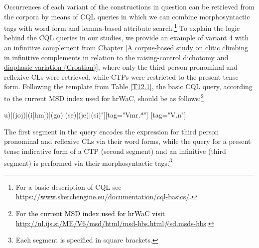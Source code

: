 \begin{table}
\caption{Permuted constructions with verbal complements.\label{T12.1}}
\end{table}

Occurrences of each variant of the constructions in question can be retrieved from the corpora by means of CQL queries in which we can combine morphosyntactic tags with word form and lemma-based attribute search.\footnote{For a basic description of CQL see \url{https://www.sketchengine.eu/documentation/cql-basics/}.} To explain the logic behind the CQL queries in our studies, we provide an example of variant 4 with an infinitive complement from Chapter \ref{A corpus-based study on clitic climbing in infinitive complements in relation to the raising-control dichotomy and diaphasic variation (Croatian)}, where only the third person pronominal and reflexive CLs were retrieved, while CTPs were restricted to the present tense form. Following the template from Table \ref{T12.1}, the basic CQL query, according to the current MSD index used for hrWaC, should be as follows:\footnote{\textcolor{black}{For the current MSD index used for hrWaC visit} \url{http://nl.ijs.si/ME/V6/msd/html/msd-hbs.html\#sd.msds-hbs}.}


\noindent\begin{verbatim*}
[(word="([mj]u)|(joj)|(i[hm])|(ga)|(se)|(je)|(si)"][tag="Vmr.*"]
[tag="V.n"]
\end{verbatim*}


\noindent The first segment in the query encodes the expression for third person pronominal and reflexive CLs via their word forms, while the query for a present tense indicative form of a CTP (second segment) and an infinitive (third segment) is performed via their morphosyntactic tags.\footnote{Each segment is specified in square brackets.}

